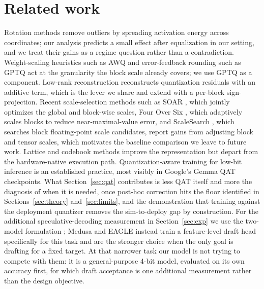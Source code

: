 \documentclass[11pt]{article}
\begin{document}
\section{Related work}\label{sec:related}
Rotation methods \cite{ashkboos2024quarot,liu2024spinquant} remove outliers by spreading
activation energy across coordinates; our analysis predicts a small effect after
equalization in our setting, and we treat their gains as a regime question rather than a
contradiction. Weight-scaling heuristics such as AWQ \cite{lin2024awq} and error-feedback
rounding such as GPTQ \cite{frantar2022gptq} act at the granularity the block scale
already covers; we use GPTQ as a component. Low-rank reconstruction \cite{zhang2024lqer}
reconstructs quantization residuals with an additive term, which is the lever we share
and extend with a per-block sign-projection. Recent scale-selection methods such as SOAR
\cite{soar2026}, which jointly optimizes the global and block-wise scales, Four Over Six
\cite{fouroversix2025}, which adaptively scales blocks to reduce near-maximal-value
error, and ScaleSearch \cite{scalesearch2026}, which searches block floating-point scale
candidates, report gains from adjusting block and tensor scales, which motivates the
baseline comparison we leave to future work. Lattice and codebook methods
\cite{chee2023quip,egiazarian2024aqlm} improve the representation but depart from the
hardware-native execution path. Quantization-aware training for low-bit inference is an
established practice, most visibly in Google's Gemma QAT checkpoints. What
Section~\ref{sec:qat} contributes is less QAT itself and more the diagnosis of when it
is needed, once post-hoc correction hits the floor identified in
Sections~\ref{sec:theory} and~\ref{sec:limits}, and the demonstration that training
against the deployment quantizer removes the sim-to-deploy gap by construction. For the
additional speculative-decoding measurement in Section~\ref{sec:exp} we use the
two-model formulation \cite{leviathan2023speculative}; Medusa \cite{cai2024medusa} and
EAGLE \cite{li2024eagle} instead train a feature-level draft head specifically for this
task and are the stronger choice when the only goal is drafting for a fixed target. At
that narrower task our model is not trying to compete with them: it is a
general-purpose 4-bit model, evaluated on its own accuracy first, for which draft
acceptance is one additional measurement rather than the design objective.
\end{document}

